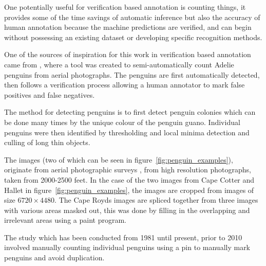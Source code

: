 One potentially useful for verification based annotation is counting things, it provides some of the time savings of automatic inference but also the accuracy of human annotation because the machine predictions are verified, and can begin without possessing an existing dataset or developing specific recognition methods.


One of the sources of inspiration for this work in verification based annotation came from \cite{McNeill2011}, where a tool was created to semi-automatically count Adelie penguins from aerial photographs. The penguins are first automatically detected, then follows a verification process allowing a human annotator to mark false positives and false negatives.

The method for detecting penguins is to first detect penguin colonies which can be done many times by the unique colour of the penguin guano. Individual penguins were then identified by thresholding and local minima detection and culling of long thin objects. 

The images (two of which can be seen in figure~\ref{fig:penguin_examples}), originate from aerial photographic surveys \cite{Lyver2014}, from high resolution photographs, taken from 2000-2500 feet. In the case of the two images from Cape Cotter and Hallet in figure~\ref{fig:penguin_examples}, the images are cropped from images of size $ 6720\times4480 $. The Cape Royds images are spliced together from three images with various areas masked out, this was done by filling in the overlapping and irrelevant areas using a paint program.

The study which has been conducted from 1981 until present, prior to 2010 involved manually counting individual penguins using a pin to manually mark penguins and avoid duplication. 





